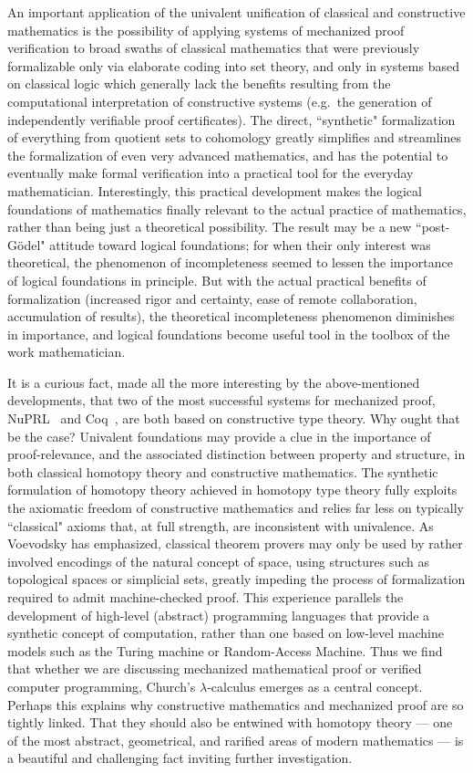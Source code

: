 \documentclass[11pt]{article}
\theoremstyle{remark}
\theoremstyle{definition}
\begin{document}
An important application of the univalent unification of classical and constructive mathematics is the possibility of applying systems of mechanized proof verification to broad swaths of classical mathematics that were previously formalizable only via elaborate coding into set theory, and only in systems based on classical logic which generally lack the benefits resulting from the computational interpretation of constructive systems (e.g.\ the generation of independently verifiable proof certificates).  The direct, ``synthetic" formalization of everything from quotient sets to cohomology greatly simplifies and streamlines the formalization of even very advanced mathematics, and has the potential to eventually make formal verification into a practical tool for the everyday mathematician.  Interestingly, this practical development makes the logical foundations of mathematics finally relevant to the actual practice of mathematics, rather than being just a theoretical possibility.  The result may be a new ``post-G\"odel" attitude toward logical foundations; for when their only interest was theoretical, the phenomenon of incompleteness seemed to lessen the importance of logical foundations in principle.  But with the actual practical benefits of formalization (increased rigor and certainty, ease of remote collaboration, accumulation of results), the theoretical incompleteness phenomenon diminishes in importance, and logical foundations become useful tool in the toolbox of the work mathematician.

It is a curious fact, made all the more interesting by the above-mentioned developments, that two of the most successful
systems for mechanized proof, NuPRL~\cite{nuprl-book} and Coq~\cite{coq}, are both based on constructive type theory.  
Why ought that be the case?  
Univalent foundations may provide a clue in the importance of proof-relevance, and the associated distinction between property and structure, in both classical homotopy theory and constructive mathematics.  The synthetic formulation of homotopy theory achieved in homotopy type theory fully exploits the axiomatic freedom of constructive mathematics and relies far less on typically ``classical" axioms that, at full strength, are inconsistent with univalence. 
As Voevodsky has emphasized, classical theorem provers may only be used by rather involved encodings of the natural concept of space, using structures such as topological spaces or simplicial sets, greatly impeding the process of formalization required to admit machine-checked proof.  
This experience parallels the development of high-level (abstract) programming languages that provide a synthetic concept of computation, rather than one based on low-level machine models such as the Turing machine or Random-Access Machine.  
Thus we find that whether we are discussing mechanized mathematical proof or verified computer programming, Church's $\lambda$-calculus emerges as a central concept.  Perhaps this explains why constructive mathematics and mechanized proof are so tightly linked.  That they should also be entwined with homotopy theory --- one of the most abstract, geometrical, and rarified areas of modern mathematics --- is a beautiful and challenging fact inviting further investigation.
\end{document}

